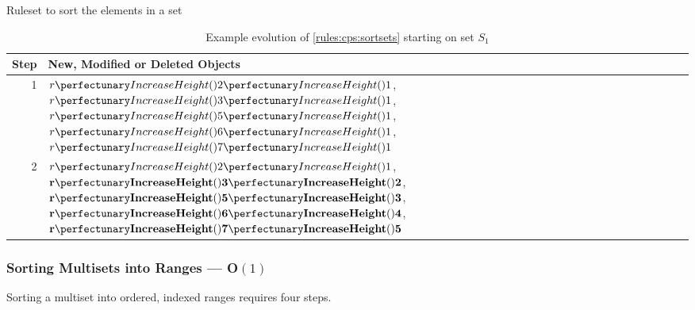 \begin{cprulesetfloat} \begin{cpruleset}

\end{cpruleset}
\caption{\label{rules:cps:sortsets}Ruleset to sort the elements in a set}
\end{cprulesetfloat}

\begin{table} \centering
   \begin{tabular}{|r|l|}
    \hline
    \textbf{Step} & \textbf{New, Modified or Deleted Objects} \\ \hline
    1 & \(\cpfuncn{r}{2}{1}\), \(\cpfuncn{r}{3}{1}\), \(\cpfuncn{r}{5}{1}\), \(\cpfuncn{r}{6}{1}\), \(\cpfuncn{r}{7}{1}\)\\ \hline
    2 & \(\cpfuncn{r}{2}{1}\), \(\mathbf{\cpfuncn{r}{3}{2}}\), \(\mathbf{\cpfuncn{r}{5}{3}}\), \(\mathbf{\cpfuncn{r}{6}{4}}\), \(\mathbf{\cpfuncn{r}{7}{5}}\)\\ \hline

\end{tabular}
\caption[Example evolution of \cref{rules:cps:sortsets}]{\label{tab:cps:sortsets}Example evolution of \cref{rules:cps:sortsets} starting on set \(S_1\)}
\end{table}

\subsubsection{Sorting Multisets into Ranges --- O\((1)\)}\label{sec:cps:sortmultisetrange}

\begin{proposition}\label{prop:cps:sortmultisetrange}
Sorting a multiset into ordered, indexed ranges requires four steps.
\end{proposition}

